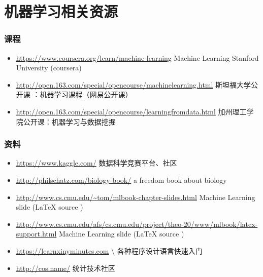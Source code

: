 \documentclass{beamer}
\begin{document}
\section{机器学习相关资源}
\label{sec-6}
\begin{frame}
\frametitle{课程}
\label{sec-6-1}


\begin{itemize}
\item \href{https://www.coursera.org/learn/machine-learning}{https://www.coursera.org/learn/machine-learning}  Machine Learning Stanford University (coursera)
\item \href{http://open.163.com/special/opencourse/machinelearning.html}{http://open.163.com/special/opencourse/machinelearning.html}  斯坦福大学公开课 ：机器学习课程（网易公开课）
\item \href{http://open.163.com/special/opencourse/learningfromdata.html}{http://open.163.com/special/opencourse/learningfromdata.html} 加州理工学院公开课：机器学习与数据挖掘
\end{itemize}
\end{frame}
\begin{frame}
\frametitle{资料}
\label{sec-6-2}

\begin{itemize}
\item \href{https://www.kaggle.com/}{https://www.kaggle.com/}
    数据科学竞赛平台、社区
\item \href{http://philschatz.com/biology-book/}{http://philschatz.com/biology-book/}  
    a  freedom book about biology
\item \href{http://www.cs.cmu.edu/~tom/mlbook-chapter-slides.html}{http://www.cs.cmu.edu/\textasciitilde tom/mlbook-chapter-slides.html}
    Machine Learning slide (\LaTeX{} source )
\item \href{http://www.cs.cmu.edu/afs/cs.cmu.edu/project/theo-20/www/mlbook/latex-support.html}{http://www.cs.cmu.edu/afs/cs.cmu.edu/project/theo-20/www/mlbook/latex-support.html} 
    Machine Learning slide (\LaTeX{} source )
\item \href{https://learnxinyminutes.com}{https://learnxinyminutes.com}  \textbackslash{}
    各种程序设计语言快速入门
\item \href{http://cos.name/}{http://cos.name/}
    统计技术社区
\end{itemize}
\end{frame}
\end{document}
